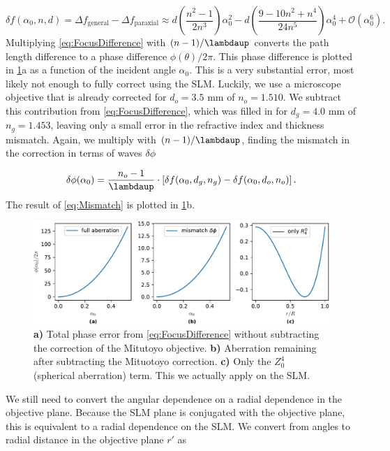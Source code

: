 \begin{equation}\label{eq:FocusDifference}
    \delta f(\alpha_0,n,d)= \Delta f_{\text{general}} - \Delta f_{\text{paraxial}} \approx
    d\left(\frac{n^2-1}{2n^3}\right)\alpha_0^2 - d\left(\frac{9-10n^2+n^4}{24n^5}\right)\alpha_0^4+\mathcal{O}(\alpha_0^6).
\end{equation}
Multiplying \cref{eq:FocusDifference} with $(n-1)/\lambdaup$ converts the path length difference to a phase difference $\phi(\theta)/2\pi$.
This phase difference is plotted in \cref{fig:AberrationTerm}a as a function of the incident angle $\alpha_0$.
This is a very substantial error, most likely not enough to fully correct using the SLM. 
Luckily, we use a microscope objective that is already corrected for $d_o=3.5$ mm of $n_o=1.510$. 
We subtract this contribution from \cref{eq:FocusDifference}, which was filled in for $d_g=4.0$ mm of $n_g=1.453$, leaving only a small error in the refractive index and thickness mismatch.
Again, we multiply with $(n-1)/\lambdaup$, finding the mismatch in the correction in terms of waves $\delta \phi$

\begin{equation}\label{eq:Mismatch}
    \delta \phi(\alpha_0)=
    \frac{n_o-1}{\lambdaup}\cdot
    \left[\delta f(\alpha_0,d_g,n_g)-\delta f(\alpha_0,d_o,n_o)\right].
\end{equation}
The result of \cref{eq:Mismatch} is plotted in \cref{fig:AberrationTerm}b.
\begin{figure}
    \centering
    \includegraphics[width=\textwidth]{figures/SphericalAberrationTerms.pdf}
    \caption{
    \textsf{\textbf{a)}} Total phase error from \cref{eq:FocusDifference} without subtracting the correction of the Mitutoyo objective.
    \textsf{\textbf{b)}} Aberration remaining after subtracting the Mituotoyo correction.
    \textsf{\textbf{c)}} Only the $Z_0^4$ (spherical aberration) term. This we actually apply on the SLM.
    }
    \label{fig:AberrationTerm}
\end{figure}
We still need to convert the angular dependence on a radial dependence in the objective plane. 
Because the SLM plane is conjugated with the objective plane, this is equivalent to a radial dependence on the SLM. We convert from angles to radial distance in the objective plane $r'$ as


